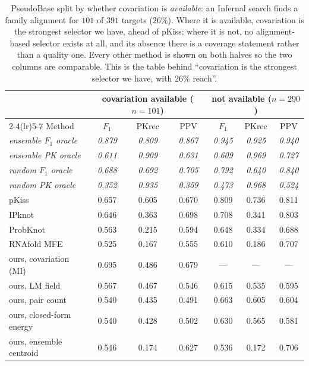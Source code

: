 \begin{table}[!t]
\caption{PseudoBase split by whether covariation is \emph{available}: an Infernal search finds a family alignment for $101$ of $391$ targets ($26\%$). Where it is available, covariation is the strongest selector we have, ahead of pKiss; where it is not, no alignment-based selector exists at all, and its absence there is a coverage statement rather than a quality one. Every other method is shown on both halves so the two columns are comparable. This is the table behind ``covariation is the strongest selector we have, with $26\%$ reach''.}
\label{tab:pkbstratum}
\centering
\footnotesize
\setlength{\tabcolsep}{5pt}
\begin{tabular}{lcccccc}
\toprule
& \multicolumn{3}{c}{covariation available ($n=101$)} & \multicolumn{3}{c}{not available ($n=290$)} \\
\cmidrule(lr){2-4}\cmidrule(lr){5-7}
Method & $F_1$ & PKrec & PPV & $F_1$ & PKrec & PPV \\
\midrule
\textit{ensemble $F_1$ oracle} & \textit{0.879} & \textit{0.809} & \textit{0.867} & \textit{0.945} & \textit{0.925} & \textit{0.940} \\
\textit{ensemble PK oracle} & \textit{0.611} & \textit{0.909} & \textit{0.631} & \textit{0.609} & \textit{0.969} & \textit{0.727} \\
\textit{random $F_1$ oracle} & \textit{0.688} & \textit{0.692} & \textit{0.705} & \textit{0.792} & \textit{0.640} & \textit{0.840} \\
\textit{random PK oracle} & \textit{0.352} & \textit{0.935} & \textit{0.359} & \textit{0.473} & \textit{0.968} & \textit{0.524} \\
\midrule
pKiss & 0.657 & 0.605 & 0.670 & 0.809 & 0.736 & 0.811 \\
IPknot & 0.646 & 0.363 & 0.698 & 0.708 & 0.341 & 0.803 \\
ProbKnot & 0.563 & 0.215 & 0.594 & 0.648 & 0.334 & 0.688 \\
RNAfold MFE & 0.525 & 0.167 & 0.555 & 0.610 & 0.186 & 0.707 \\
ours, covariation (MI) & 0.695 & 0.486 & 0.679 & --- & --- & --- \\
ours, LM field & 0.567 & 0.467 & 0.546 & 0.615 & 0.535 & 0.595 \\
ours, pair count & 0.540 & 0.435 & 0.491 & 0.663 & 0.605 & 0.604 \\
ours, closed-form energy & 0.540 & 0.428 & 0.502 & 0.630 & 0.565 & 0.581 \\
ours, ensemble centroid & 0.546 & 0.174 & 0.627 & 0.536 & 0.172 & 0.706 \\
\bottomrule
\end{tabular}
\end{table}
